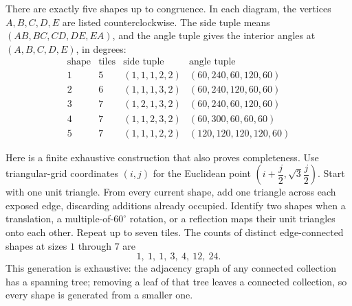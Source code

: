 There are exactly five shapes up to congruence. In each diagram, the vertices $A,B,C,D,E$ are listed counterclockwise. The side tuple means $(AB,BC,CD,DE,EA)$, and the angle tuple gives the interior angles at $(A,B,C,D,E)$, in degrees:
\[
\begin{array}{c|c|c|c}
\text{shape}&\text{tiles}&\text{side tuple}&\text{angle tuple}\\\hline
1&5&(1,1,1,2,2)&(60,240,60,120,60)\\
2&6&(1,1,1,3,2)&(60,240,120,60,60)\\
3&7&(1,2,1,3,2)&(60,240,60,120,60)\\
4&7&(1,1,2,3,2)&(60,300,60,60,60)\\
5&7&(1,1,1,2,2)&(120,120,120,120,60)
\end{array}
\]

Here is a finite exhaustive construction that also proves completeness. Use triangular-grid coordinates $(i,j)$ for the Euclidean point $(i+\dfrac{j}{2},\sqrt3\dfrac{j}{2})$. Start with one unit triangle. From every current shape, add one triangle across each exposed edge, discarding additions already occupied. Identify two shapes when a translation, a multiple-of-$60^\circ$ rotation, or a reflection maps their unit triangles onto each other. Repeat up to seven tiles. The counts of distinct edge-connected shapes at sizes $1$ through $7$ are
\[
1,\ 1,\ 1,\ 3,\ 4,\ 12,\ 24.
\]
This generation is exhaustive: the adjacency graph of any connected collection has a spanning tree; removing a leaf of that tree leaves a connected collection, so every shape is generated from a smaller one.

